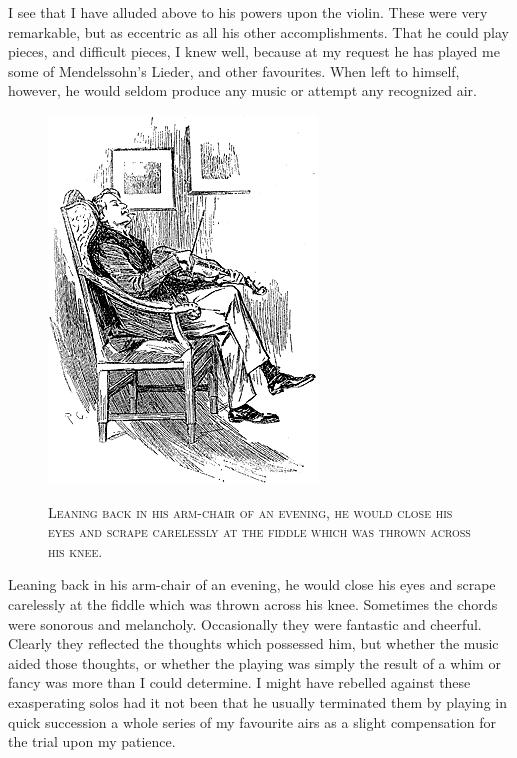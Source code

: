 \documentclass[12pt,english,oneside]{book}
\newcommand{\noun}[1]{\textsc{#1}}
\begin{document}
I see that I have alluded above to his powers upon the violin. These
were very remarkable, but as eccentric as all his other accomplishments.
That he could play pieces, and difficult pieces, I knew well, because
at my request he has played me some of Mendelssohn's Lieder, and other
favourites. When left to himself, however, he would seldom produce
any music or attempt any recognized air. %
\begin{figure}[htbp]
\noindent \begin{center}\includegraphics{images/study10-stud-03.png}\end{center}

\noindent \begin{center}\noun{Leaning back in his arm-chair of an
evening, he would close his eyes and scrape carelessly at the fiddle
which was thrown across his knee.}\end{center}
\end{figure}
Leaning back in his arm-chair of an evening, he would close his eyes
and scrape carelessly at the fiddle which was thrown across his knee.
Sometimes the chords were sonorous and melancholy. Occasionally they
were fantastic and cheerful. Clearly they reflected the thoughts which
possessed him, but whether the music aided those thoughts, or whether
the playing was simply the result of a whim or fancy was more than
I could determine. I might have rebelled against these exasperating
solos had it not been that he usually terminated them by playing in
quick succession a whole series of my favourite airs as a slight compensation
for the trial upon my patience.
\end{document}
